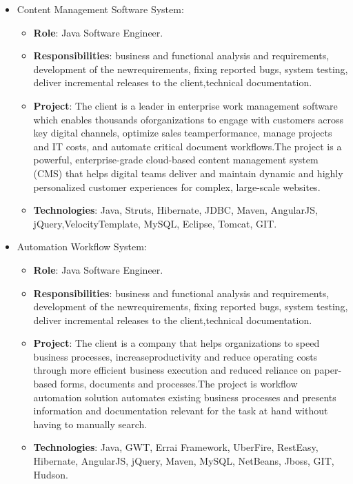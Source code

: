 \documentclass[11pt,a4paper,sans]{moderncv}        %
\begin{document}
\vspace{10mm}

  {
    \begin{itemize}
      \item Content Management Software System:
        \begin{itemize}
          \item \textbf{Role}: Java Software Engineer. 
          \item \textbf{Responsibilities}: business and functional analysis and requirements, development of the newrequirements, fixing reported bugs, system testing, deliver incremental releases to the client,technical documentation.
          \item \textbf{Project}: The client is a leader in enterprise work management software which enables thousands oforganizations to engage with customers across key digital channels, optimize sales teamperformance, manage projects and IT costs, and automate critical document workflows.The project is a powerful, enterprise-grade cloud-based content management system (CMS) that helps digital teams deliver and maintain dynamic and highly personalized customer experiences for complex, large-scale websites.
          \item \textbf{Technologies}: Java, Struts, Hibernate, JDBC, Maven, AngularJS, jQuery,VelocityTemplate, MySQL, Eclipse, Tomcat, GIT.
        \end{itemize}
    \end{itemize}
  }

\vspace{10mm}

  {
    \begin{itemize}
      \item Automation Workflow System:
        \begin{itemize}
          \item \textbf{Role}: Java Software Engineer. 
          \item \textbf{Responsibilities}: business and functional analysis and requirements, development of the newrequirements, fixing reported bugs, system testing, deliver incremental releases to the client,technical documentation.
          \item \textbf{Project}: The client is a company that helps organizations to speed business processes, increaseproductivity and reduce operating costs through more efficient business execution and reduced reliance on paper-based forms, documents and processes.The project is workflow automation solution automates existing business processes and presents information and documentation relevant for the task at hand without having to manually search.
          \item \textbf{Technologies}: Java, GWT, Errai Framework, UberFire, RestEasy, Hibernate, AngularJS, jQuery, Maven, MySQL, NetBeans, Jboss, GIT, Hudson.
        \end{itemize}
    \end{itemize}
  }
\end{document}
